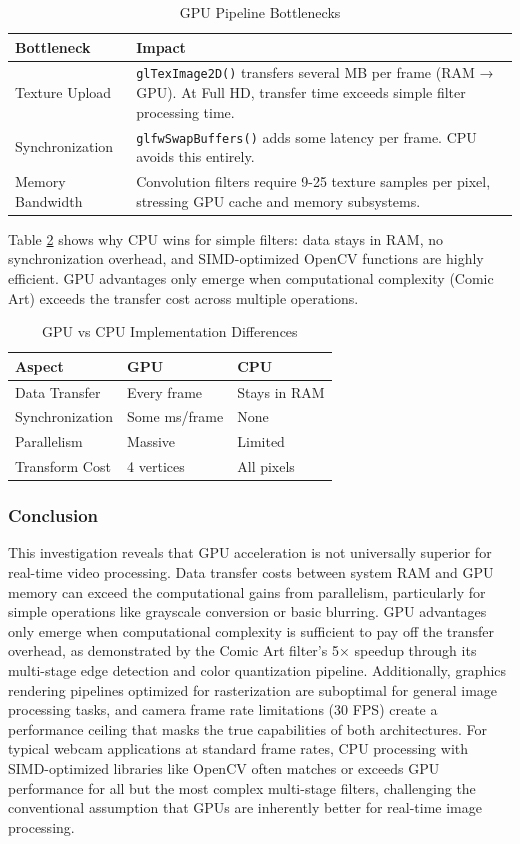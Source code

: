 \documentclass[12pt,a4paper]{article}
\begin{document}
\begin{table}[H]
\centering
\caption{GPU Pipeline Bottlenecks}
\label{tab:gpu_bottlenecks}
\begin{tabular}{lp{7cm}}
\toprule
\textbf{Bottleneck} & \textbf{Impact} \\
\midrule
Texture Upload & \texttt{glTexImage2D()} transfers several MB per frame (RAM → GPU). At Full HD, transfer time exceeds simple filter processing time. \\
Synchronization & \texttt{glfwSwapBuffers()} adds some latency per frame. CPU avoids this entirely. \\
Memory Bandwidth & Convolution filters require 9-25 texture samples per pixel, stressing GPU cache and memory subsystems. \\
\bottomrule
\end{tabular}
\end{table}
Table \ref{tab:shader_cpu_comparison} shows why CPU wins for simple filters: data stays in RAM, no synchronization overhead, and SIMD-optimized OpenCV functions are highly efficient. GPU advantages only emerge when computational complexity (Comic Art) exceeds the transfer cost across multiple operations.
\begin{table}[H]
\centering
\caption{GPU vs CPU Implementation Differences}
\label{tab:shader_cpu_comparison}
\begin{tabular}{lll}
\toprule
\textbf{Aspect} & \textbf{GPU} & \textbf{CPU} \\
\midrule
Data Transfer & Every frame & Stays in RAM \\
Synchronization & Some ms/frame & None \\
Parallelism & Massive & Limited \\
Transform Cost & 4 vertices & All pixels \\
\bottomrule
\end{tabular}
\end{table}

\subsubsection{Conclusion}
This investigation reveals that GPU acceleration is not universally superior for real-time video processing. Data transfer costs between system RAM and GPU memory can exceed the computational gains from parallelism, particularly for simple operations like grayscale conversion or basic blurring. GPU advantages only emerge when computational complexity is sufficient to pay off the transfer overhead, as demonstrated by the Comic Art filter's 5× speedup through its multi-stage edge detection and color quantization pipeline. Additionally, graphics rendering pipelines optimized for rasterization are suboptimal for general image processing tasks, and camera frame rate limitations (30 FPS) create a performance ceiling that masks the true capabilities of both architectures. For typical webcam applications at standard frame rates, CPU processing with SIMD-optimized libraries like OpenCV often matches or exceeds GPU performance for all but the most complex multi-stage filters, challenging the conventional assumption that GPUs are inherently better for real-time image processing.
\end{document}
